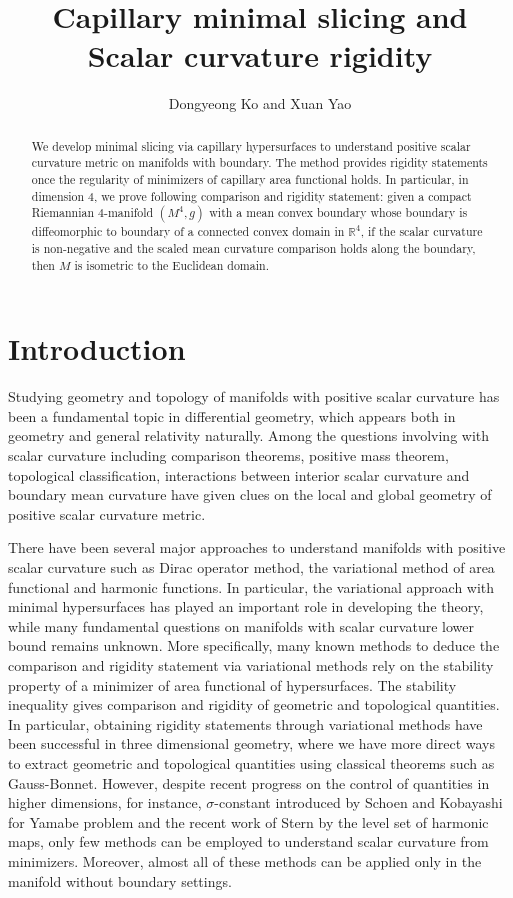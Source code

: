 \documentclass[11pt,letterpaper]{amsart}
\title{Capillary minimal slicing and Scalar curvature rigidity}
\author{Dongyeong Ko and Xuan Yao}
\begin{document}
\begin{abstract}
    We develop minimal slicing via capillary hypersurfaces to understand positive scalar curvature metric on manifolds with boundary. The method provides rigidity statements once the regularity of minimizers of capillary area functional holds. In particular, in dimension $4$, we prove following comparison and rigidity statement: given a compact Riemannian $4$-manifold $(M^4,g)$ with a mean convex boundary whose boundary is diffeomorphic to boundary of a connected convex domain in $\mathbb R^4$, if the scalar curvature is non-negative and the scaled mean curvature comparison holds along the boundary, then $M$ is isometric to the Euclidean domain.
\end{abstract}

\maketitle

\section{Introduction}
Studying geometry and topology of manifolds with positive scalar curvature has been a fundamental topic in differential geometry, which appears both in geometry and general relativity naturally. Among the questions involving with scalar curvature including comparison theorems, positive mass theorem, topological classification, interactions between interior scalar curvature and boundary mean curvature have given clues on the local and global geometry of positive scalar curvature metric.

There have been several major approaches to understand manifolds with positive scalar curvature such as Dirac operator method, the variational method of area functional and harmonic functions. In particular, the variational approach with minimal hypersurfaces has played an important role in developing the theory, while many fundamental questions on manifolds with scalar curvature lower bound remains unknown. More specifically, many known methods to deduce the comparison and rigidity statement via variational methods rely on the stability property of a minimizer of area functional of hypersurfaces. The stability inequality gives comparison and rigidity of geometric and topological quantities. In particular, obtaining rigidity statements through variational methods have been successful in three dimensional geometry, where we have more direct ways to extract geometric and topological quantities using classical theorems such as Gauss-Bonnet. However, despite recent progress on the control of quantities in higher dimensions, for instance, $\sigma$-constant introduced by Schoen \cite{schoen2006variational} and Kobayashi \cite{kobayashi1986scalar} for Yamabe problem and the recent work of Stern \cite{stern2022scalar} by the level set of harmonic maps, only few methods can be employed to understand scalar curvature from minimizers. Moreover, almost all of these methods can be applied only in the manifold without boundary settings.
\end{document}
